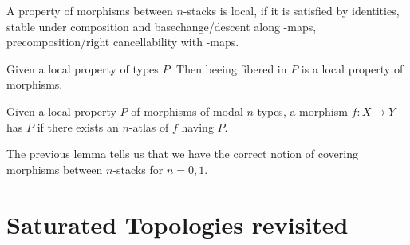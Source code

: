 \begin{definition}
	A property of morphisms between  $n$-stacks is local, if it is satisfied by identities, stable under composition and basechange/descent along \Cov-maps, precomposition/right cancellability with \Cov-maps.
\end{definition}
\begin{lemma}
	Given a local property of types $P$. Then beeing fibered in $P$ is a local property of morphisms.
\end{lemma}
\begin{lemma}
	Given a local property $P$ of morphisms of modal $n$-types, a morphism $f : X \to Y$ has $P$ if there exists an $n$-atlas of $f$ having $P$.
\end{lemma}
The previous lemma tells us that we have the correct notion of covering morphisms between  $n$-stacks for $n = 0,1$.


\section{Saturated Topologies revisited}

